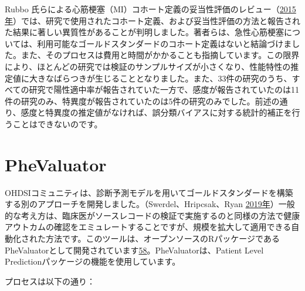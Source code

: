 \documentclass[
  11pt]{book}
\theoremstyle{definition}
\theoremstyle{definition}
\theoremstyle{definition}
\theoremstyle{definition}
\theoremstyle{remark}
\begin{document}
Rubbo 氏らによる心筋梗塞（MI）コホート定義の妥当性評価のレビュー（\href{https://ohdsi.github.io/TheBookOfOhdsi/ClinicalValidity.html\#ref-Rubbo2015phenotypes}{2015年}）では、研究で使用されたコホート定義、および妥当性評価の方法と報告された結果に著しい異質性があることが判明しました。著者らは、急性心筋梗塞については、利用可能なゴールドスタンダードのコホート定義はないと結論づけました。また、そのプロセスは費用と時間がかかることも指摘しています。この限界により、ほとんどの研究では検証のサンプルサイズが小さくなり、性能特性の推定値に大きなばらつきが生じることとなりました。また、33件の研究のうち、すべての研究で陽性適中率が報告されていた一方で、感度が報告されていたのは11件の研究のみ、特異度が報告されていたのは5件の研究のみでした。前述の通り、感度と特異度の推定値がなければ、誤分類バイアスに対する統計的補正を行うことはできないのです。

\section{PheValuator}\label{phevaluator}


OHDSIコミュニティは、診断予測モデルを用いてゴールドスタンダードを構築する別のアプローチを開発しました。（Swerdel、Hripcsak、Ryan \href{https://ohdsi.github.io/TheBookOfOhdsi/ClinicalValidity.html\#ref-Swerdel2019phevaluator}{2019年}）一般的な考え方は、臨床医がソースレコードの検証で実施するのと同様の方法で健康アウトカムの確認をエミュレートすることですが、規模を拡大して適用できる自動化された方法です。このツールは、オープンソースのRパッケージであるPheValuatorとして開発されています\href{https://ohdsi.github.io/TheBookOfOhdsi/ClinicalValidity.html\#fn58}{58}。PheValuatorは、Patient Level Predictionパッケージの機能を使用しています。

プロセスは以下の通り：
\end{document}
